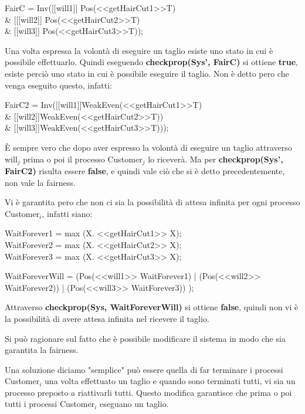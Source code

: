 \begin{center}
	\textsf{FairC = Inv([[will1]] Pos(<<getHairCut1>>T) \\\& [[[will2]] Pos(<<getHairCut2>>T) \\\& [[will3]] Pos(<<getHairCut3>>T)); }
\end{center}

Una volta espressa la volontà di eseguire un taglio esiste uno stato in cui è possibile effettuarlo. Quindi eseguendo \textbf{checkprop(Sys', FairC)} si ottiene \textbf{true}, esiste perciò uno stato in cui è possibile eseguire il taglio. Non è detto pero che venga eseguito questo, infatti:

\begin{center}
	\textsf{FairC2 = Inv([[will1]]WeakEven(<<getHairCut1>>T) \\\& [[will2]]WeakEven(<<getHairCut2>>T)) \\\& [[will3]]WeakEven(<<getHairCut3>>T)));}
\end{center}

È sempre vero che dopo aver espresso la volontà di eseguire un taglio attraverso \textsf{will$_{j}$} prima o poi il processo \textsf{Customer$_{j}$} lo riceverà. Ma per\textbf{ checkprop(Sys', FairC2)} risulta essere \textbf{false}, e quindi vale ciò che si è detto precedentemente, non vale la fairness.

Vi è garantita pero che non ci sia la possibilità di attesa infinita per ogni processo \textsf{Customer$_{i}$}, infatti siano:
\begin{center}
\textsf{WaitForever1 = max (X. <<getHairCut1>> X);}\\
\textsf{WaitForever2 = max (X. <<getHairCut2>> X);}\\
\textsf{WaitForever3 = max (X. <<getHairCut3>> X);}\\\mbox{}


\textsf{WaitForeverWill = (Pos(<<will1>> WaitForever1) | (Pos(<<will2>> WaitForever2)) | (Pos(<<will3>> WaitForever3)) );}
\end{center}

Attraverso \textbf{checkprop(Sys, WaitForeverWill)} si ottiene \textbf{false}, quindi non vi è la possibilità di avere attesa infinita nel ricevere il taglio.

Si può ragionare sul fatto che è possibile modificare il sistema in modo che sia garantita la fairness.

Una soluzione diciamo "semplice" può essere quella di far terminare i processi \textsf{Customer$_{i}$} una volta effettuato un taglio e quando sono terminati tutti, vi sia un processo preposto a riattivarli tutti. Questo modifica garantisce che prima o poi tutti i processi \textsf{Customer$_{i}$} eseguano un taglio.

